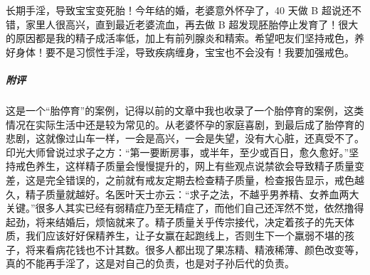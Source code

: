 \begin{case}
    长期手淫，导致宝宝变死胎！今年结的婚，老婆意外怀孕了，40 天做 B 超说还不错，家里人很高兴，直到最近老婆流血，再去做 B 超发现胚胎停止发育了！很大的原因都是我的精子成活率低，加上有前列腺炎和精索。希望吧友们坚持戒色，养好身体！要不是习惯性手淫，导致疾病缠身，宝宝也不会没有！我要加强戒色。
    \subparagraph{附评} 这是一个“胎停育”的案例，记得以前的文章中我也收录了一个胎停育的案例，这类情况在实际生活中还是较为常见的。从老婆怀孕的家庭喜剧，到最后成了胎停育的悲剧，这就像过山车一样，一会是高兴，一会是失望，没有大心脏，还真受不了。印光大师曾说过求子之方：“第一要断房事，或半年，至少或百日，愈久愈好。”坚持戒色养生，这样精子质量会慢慢提升的，网上有些观点说禁欲会导致精子质量变差，这是完全错误的，之前就有戒友定期去检查精子质量，检查报告显示，戒色越久，精子质量就越好。名医叶天士亦云：“求子之法，不越乎男养精、女养血两大关键。”很多人其实已经有弱精症乃至无精症了，而他们自己还浑然不觉，依然撸得起劲，将来结婚后，烦恼就来了。精子质量关乎传宗接代，决定着孩子的先天体质，我们应该好好保精养生，让子女赢在起跑线上，否则生下一个羸弱不堪的孩子，将来看病花钱也不计其数。很多人都出现了果冻精、精液稀薄、颜色改变等，真的不能再手淫了，这是对自己的负责，也是对子孙后代的负责。
\end{case}

